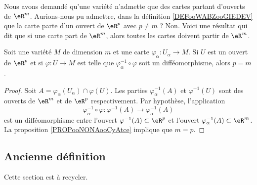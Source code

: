 Nous avons demandé qu'une variété n'admette que des cartes partant d'ouverts de \( \eR^m\). Aurions-nous pu admettre, dans la définition \ref{DEFooWABZooGIEDEV} que la carte parte d'un ouvert de \( \eR^p\) avec \( p\neq m\) ? Non. Voici une résultat qui dit que si une carte part de \( \eR^m\), alors toutes les cartes doivent partir de \( \eR^m\).

\begin{proposition}
    Soit une variété \( M\) de dimension \( m\) et une carte \( \varphi_{\alpha}\colon U_{\alpha}\to M\). Si \( U\) est un ouvert de \( \eR^p\) et si \( \varphi\colon U\to M\) est telle que \( \varphi_{\alpha}^{-1}\circ \varphi\) soit un difféomorphisme, alors \( p=m\).
\end{proposition}

\begin{proof}
    Soit \( A=\varphi_{\alpha}(U_{\alpha})\cap \varphi(U)\). Les parties \( \varphi_{\alpha}^{-1}(A)\) et \( \varphi^{-1}(U)\) sont des ouverts de \( \eR^m\) et de \( \eR^p\) respectivement. Par hypothèse, l'application
    \begin{equation}
        \varphi_{\alpha}^{-1}\circ\varphi\colon \varphi^{-1}(A)\to \varphi_{\alpha}^{-1}(A)
    \end{equation}
    est un difféomorphisme entre l'ouvert \( \varphi^{-1}(A)\subset \eR^p\) et l'ouvert \( \varphi_{\alpha}^{-1}(A)\subset \eR^m\). La proposition \ref{PROPooNONAooCyAtce} implique que \( m=p\).
\end{proof}

\subsection{Ancienne définition}

Cette section est à recycler.


